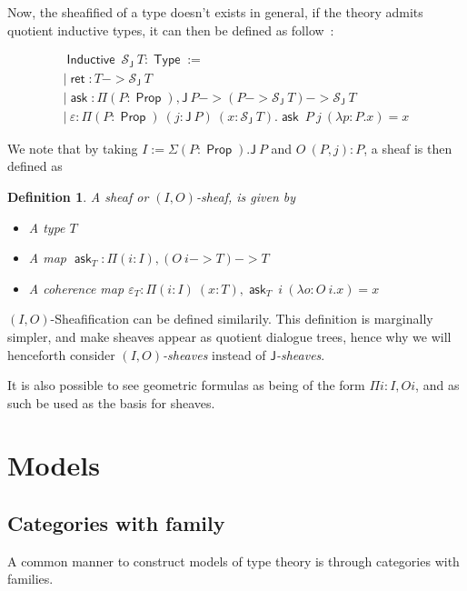 \documentclass[11pt]{article}
\newtheorem{definition}[theorem]{Definition}
\DeclareMathOperator{\Prop}{\mathsf{Prop}}
\DeclareMathOperator{\Type}{\mathsf{Type}}
\DeclareMathOperator{\ask}{\mathsf{ask}}
\DeclareMathOperator{\Inductive}{\mathsf{Inductive}}
\DeclareMathOperator{\ret}{\mathsf{ret}}
\newcommand{\0}{\mathbf{0}}
\newcommand{\1}{\mathbf{1}}
\begin{document}
Now, the sheafified of a type doesn't exists in general, if the theory admits quotient inductive types, it can then be defined as follow~:

$$
\begin{array}{l}
    \Inductive\ \mathcal{S}_{\mathsf{J}}\ T : \Type := \\
    | \ret : T -> \mathcal{S}_{\mathsf{J}}\ T\\
    | \ask : \Pi (P:\Prop), \mathsf{J}\ P -> (P -> \mathcal{S}_{\mathsf{J}}\ T) -> \mathcal{S}_{\mathsf{J}}\ T\\
    |\ \varepsilon : \Pi (P:\Prop)\ (j : \mathsf J\ P)\ (x : \mathcal{S}_{\mathsf{J}}\ T). \ask\ P\ j\ (\lambda p:P. x) = x
\end{array}
$$

We note that by taking $I := \Sigma (P:\Prop). \mathsf{J}\ P$ and $O\ (P,j) : P$, a sheaf is then defined as
\begin{definition}\label{IOshf}
    A \emph{sheaf} or \emph{$(I,O)$-sheaf}, is given by
\begin{itemize}
    \item A type $T$
    \item A map $\ask_T : \Pi (i:I), (O\ i -> T) -> T$
    \item A coherence map $\varepsilon_T : \Pi(i:I)\ (x:T), \ask_T\ i\ (\lambda o:O\  i.x) = x$
\end{itemize}

\end{definition}

$(I,O)$-Sheafification can be defined similarily. This definition is marginally simpler, and make sheaves appear as quotient dialogue trees, hence why we will henceforth consider \emph{$(I,O)$-sheaves} instead of \emph{$\mathsf{J}$-sheaves}.

It is also possible to see geometric formulas as being of the form $\Pi i : I, O i$, and as such be used as the basis for sheaves.

\section{Models}\label{Models}

\subsection{Categories with family}

A common manner to construct models of type theory is through categories with families.
\end{document}

